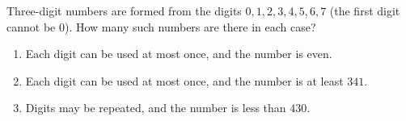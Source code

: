 Three-digit numbers are formed from the digits $0,1,2,3,4,5,6,7$ (the first digit cannot be $0$). How many such numbers are there in each case?
\begin{enumerate}
\item[(a)] Each digit can be used at most once, and the number is even.
\item[(b)] Each digit can be used at most once, and the number is at least $341$.
\item[(c)] Digits may be repeated, and the number is less than $430$.
\end{enumerate}
